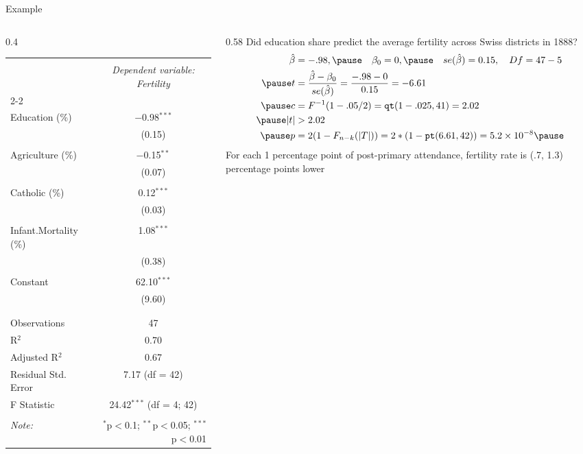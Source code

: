 \documentclass[aspectratio=169, handout, t]{beamer}
\numberwithin{equation}{section}
\begin{document}
\begin{frame}{Example}
\begin{columns}
\begin{column}{0.4\textwidth}
\tiny{
\begin{table}[!htbp] \centering 

\begin{tabular}{@{\extracolsep{5pt}}lc} 
\\[-1.8ex]\hline 
\hline \\[-1.8ex] 
 & \multicolumn{1}{c}{\textit{Dependent variable: Fertility}} \\ 
\cline{2-2} 
\\[-1.8ex] 
 Education (\%) & $-$0.98$^{***}$ \\ 
  & (0.15) \\ 
  & \\ 
 Agriculture  (\%) & $-$0.15$^{**}$ \\ 
  & (0.07) \\ 
  & \\ 
 Catholic (\%) & 0.12$^{***}$ \\ 
  & (0.03) \\ 
  & \\ 
 Infant.Mortality  (\%) & 1.08$^{***}$ \\ 
  & (0.38) \\ 
  & \\ 
 Constant & 62.10$^{***}$ \\ 
  & (9.60) \\ 
  & \\ 
\hline \\[-1.8ex] 
Observations & 47 \\ 
R$^{2}$ & 0.70 \\ 
Adjusted R$^{2}$ & 0.67 \\ 
Residual Std. Error & 7.17 (df = 42) \\ 
F Statistic & 24.42$^{***}$ (df = 4; 42) \\ 
\hline \\[-1.8ex] 
\textit{Note:}  & \multicolumn{1}{r}{$^{*}$p$<$0.1; $^{**}$p$<$0.05; $^{***}$p$<$0.01} \\ 
\end{tabular} 
\end{table} }
    \end{column}
    \begin{column}{0.58\textwidth}
 Did education share predict the average fertility across Swiss districts in 1888?\pause
\begin{align*}
\hat{\beta}&=-.98, \pause\quad \beta_0=0, \pause\quad se(\hat{\beta})=0.15, \quad Df=47-5\\\pause
t&=\frac{\hat{\beta}-\beta_0}{se(\hat{\beta})}=\frac{-.98-0}{0.15}=-6.61\\\pause
 c&=F^{-1}(1-.05/2)=\texttt{qt}(1-.025,41)=2.02\\\pause
  |t|&>2.02\\\pause
  p&=2(1-F_{n-k}(|T|))=2*(1-\texttt{pt}(6.61, 42))=5.2\times 10^{-8}\pause
  \end{align*}
  For each 1 percentage point of post-primary attendance, fertility rate is (.7, 1.3) percentage points lower
        \end{column}
\end{columns}
\end{frame}
\end{document}
